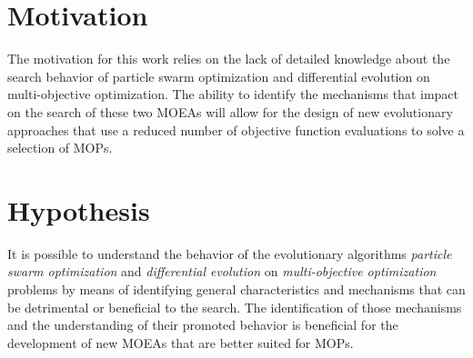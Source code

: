 
\section{Motivation}

The motivation for this work relies on the lack of detailed knowledge about the search behavior of particle swarm optimization and differential evolution on multi-objective optimization. The ability to identify the mechanisms that impact on the search of these two MOEAs will allow for the design of new evolutionary approaches that use a reduced number of objective function evaluations to solve a selection of MOPs. 

\section{Hypothesis}

It is possible to understand the behavior of the evolutionary algorithms \emph{particle swarm optimization} and \emph{differential evolution} on \emph{multi-objective optimization} problems  by means of identifying general characteristics and mechanisms that can be detrimental or beneficial to the search. The identification of those mechanisms and the understanding of their promoted behavior is beneficial for the development of new MOEAs that are better suited for MOPs. 

